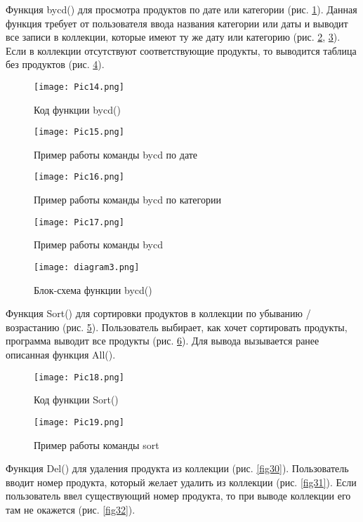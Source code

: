 \documentclass[14pt]{extreport}
\begin{document}
Функция bycd() для просмотра продуктов по дате или категории (рис. \ref{fig24}). Данная функция требует от пользователя ввода названия категории или даты и выводит все записи в коллекции, которые имеют ту же дату или категорию (рис. \ref{fig25}, \ref{fig26}). Если в коллекции отсутствуют соответствующие продукты, то выводится таблица без продуктов (рис. \ref{fig27}).

\begin{figure}[H]
\centerline{\texttt{[image: Pic14.png]}}
\caption{Код функции bycd()}
\label{fig24}
\end{figure}

\begin{figure}[H]
\centerline{\texttt{[image: Pic15.png]}}
\caption{Пример работы команды bycd по дате}
\label{fig25}
\end{figure}

\begin{figure}[H]
\centerline{\texttt{[image: Pic16.png]}}
\caption{Пример работы команды bycd по категории}
\label{fig26}
\end{figure}

\begin{figure}[H]
\centerline{\texttt{[image: Pic17.png]}}
\caption{Пример работы команды bycd}
\label{fig27}
\end{figure}

\begin{figure}[H]
\centerline{\texttt{[image: diagram3.png]}}
\caption{Блок-схема функции bycd()}
\end{figure}

Функция Sort() для сортировки продуктов в коллекции по убыванию / возрастанию (рис. \ref{fig28}). Пользователь выбирает, как хочет сортировать продукты, программа выводит все продукты (рис. \ref{fig29}). Для вывода вызывается ранее описанная функция All().

\begin{figure}[H]
\centerline{\texttt{[image: Pic18.png]}}
\caption{Код функции Sort()}
\label{fig28}
\end{figure}

\begin{figure}[H]
\centerline{\texttt{[image: Pic19.png]}}
\caption{Пример работы команды sort}
\label{fig29}
\end{figure}

Функция Del() для удаления продукта из коллекции (рис. \ref{fig30}). Пользователь вводит номер продукта, который желает удалить из коллекции (рис. \ref{fig31}). Если пользователь ввел существующий номер продукта, то при выводе коллекции его там не окажется (рис. \ref{fig32}).
\end{document}
